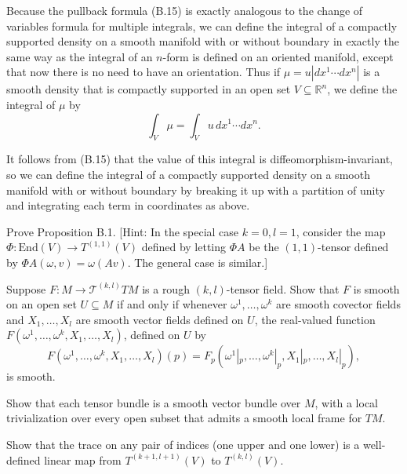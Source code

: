 Because the pullback formula (B.15) is exactly analogous to the change of variables formula for multiple integrals, we can define the integral of a compactly supported density on a smooth manifold with or without boundary in exactly the same way as the integral of an $n$-form is defined on an oriented manifold, except that now there is no need to have an orientation. Thus if $\mu = u |dx^1 \cdots dx^n|$ is a smooth density that is compactly supported in an open set $V \subseteq \mathbb{R}^n$, we define the integral of $\mu$ by
\[
\int_V \mu = \int_V u \, dx^1 \cdots dx^n.
\]

It follows from (B.15) that the value of this integral is diffeomorphism-invariant, so we can define the integral of a compactly supported density on a smooth manifold with or without boundary by breaking it up with a partition of unity and integrating each term in coordinates as above.

\begin{exercise}
\label{exer:prove-multilinear-maps-isomorphism}
Prove Proposition B.1. [Hint: In the special case $k = 0, l = 1$, consider the map $\Phi : \text{End}(V) \to T^{(1,1)}(V)$ defined by letting $\Phi A$ be the $(1, 1)$-tensor defined by $\Phi A(\omega, v) = \omega(Av)$. The general case is similar.]
\end{exercise}

\begin{exercise}\label{exer:smooth-tensor-field-criterion}
Suppose $F: M \to \mathcal{T}^{(k,l)} T M$ is a rough $(k,l)$-tensor field. Show that $F$ is smooth on an open set $U \subseteq M$ if and only if whenever $\omega^1, \ldots, \omega^k$ are smooth covector fields and $X_1, \ldots, X_l$ are smooth vector fields defined on $U$, the real-valued function $F(\omega^1, \ldots, \omega^k, X_1, \ldots, X_l)$, defined on $U$ by
\[F(\omega^1, \ldots, \omega^k, X_1, \ldots, X_l)(p) = F_p(\omega^1|_p, \ldots, \omega^k|_p, X_1|_p, \ldots, X_l|_p),\]
is smooth.
\end{exercise}

\begin{exercise}\label{exer:tensor-bundle-smooth-vector-bundle}
Show that each tensor bundle is a smooth vector bundle over $M$, with a local trivialization over every open subset that admits a smooth local frame for $T M$.
\end{exercise}

\begin{exercise}
\label{exer:trace-well-defined}
Show that the trace on any pair of indices (one upper and one lower) is a well-defined linear map from $T^{(k+1,l+1)}(V)$ to $T^{(k,l)}(V)$.
\end{exercise}
